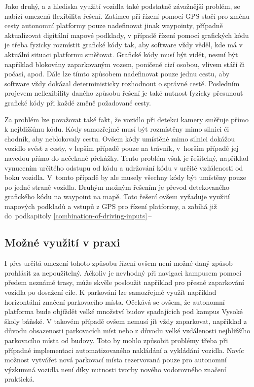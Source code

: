 \documentclass[czech, bachelor]{diploma}
\newcommand{\peteref}[1]{\ref{#1}\,--\,\nameref{#1}}
\begin{document}
Jako druhý, a z hlediska využití vozidla také podstatně závažnější problém, se nabízí omezená flexibilita řešení. Zatímco při
řízení pomocí GPS stačí pro změnu cesty autonomní platformy pouze nadefinovat jinak waypointy, případně aktualizovat digitální
mapové podklady, v případě řízení pomocí grafických kódu je třeba fyzicky rozmístit grafické kódy tak, aby software vždy věděl,
kde má v aktuální situaci platformu směřovat. Grafické kódy musí být vidět, nesmí být například blokovány zaparkovaným vozem,
poničené cizí osobou, vlivem stáří či počasí, apod. Dále lze tímto způsobem nadefinovat pouze jednu cestu, aby software vždy
dokázal deterministicky rozhodnout o správné cestě. Posledním projevem neflexibility daného způsobu řešení je také nutnost fyzicky
přesunout grafické kódy při každé změně požadované cesty.

Za problém lze považovat také fakt, že vozidlo při detekci kamery směřuje přímo k nejbližšímu kódu. Kódy samozřejmě musí být
rozmístěny mimo silnici či chodník, aby neblokovaly cestu. Ovšem kódy umístěné mimo silnici dokážou vozidlo svést z cesty,
v lepším případě pouze na trávník, v~horším případě jej navedou přímo do nečekané překážky. Tento problém však je řešitelný,
například vynucením určitého odstupu od kódu a udržování kódu v určité vzdálenosti od boku vozidla.  V~tomto případě by ale musely
všechny kódy být umístěny pouze po jedné straně vozidla. Druhým možným řešením je převod detekovaného grafického kódu na waypoint
na mapě. Toto řešení ovšem vyžaduje využití mapových podkladů a vstupů z GPS pro řízení platformy, a zabíhá již do~podkapitoly
\peteref{combination-of-driving-inputs}

\subsection{Možné využití v praxi}

I přes určitá omezení tohoto způsobu řízení ovšem není možné daný způsob prohlásit za nepoužitelný. Ačkoliv je nevhodný
při navigaci kampusem pomocí předem neznámé trasy, může skvěle posloužit například pro přesné zaparkování vozidla po dosažení
cíle. K parkování lze samozřejmě využít například horizontální značení parkovacího místa. Očekává se ovšem, že autonomní platforma
bude objíždět velké množství budov spadajících pod kampus Vysoké školy báňské. V takovém případě ovšem nemusí jít vždy zaparkovat,
například z důvodu obsazenosti parkovacích míst nebo z důvodu velké vzdálenosti nejbližšího parkovacího místa od budovy. Toto by
mohlo způsobit problémy třeba při případné implementaci automatizovaného nakládání a vykládání vozidla. Navíc možnost vytvářet
nová parkovací místa rezervovaná pouze pro autonomní výzkumná vozidla není díky nutnosti tvorby nového vodorovného značení
praktická.
\end{document}

